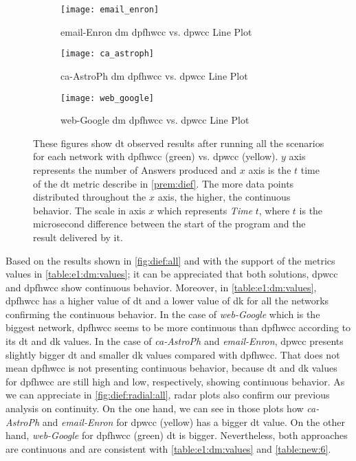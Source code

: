 \begin{figure}[h!]
  \centering
  \begin{subfigure}[t]{0.3\textwidth}
   \texttt{[image: email\_enron]}
   \caption{email-Enron \acrlong{dm} \acrshort{dpfhwcc} vs. \acrshort{dpwcc} Line Plot}
    \label{fig:dief:new:1}
  \end{subfigure}\hfill
  \begin{subfigure}[t]{0.3\textwidth}
   \texttt{[image: ca\_astroph]}
   \caption{ca-AstroPh \acrlong{dm} \acrshort{dpfhwcc} vs. \acrshort{dpwcc} Line Plot}
    \label{fig:dief:new:2}
  \end{subfigure}\hfill
  \begin{subfigure}[t]{0.3\textwidth}
   \texttt{[image: web\_google]}
   \caption{web-Google \acrlong{dm} \acrshort{dpfhwcc} vs. \acrshort{dpwcc} Line Plot}
    \label{fig:dief:new:3}
  \end{subfigure}\hfill
   \caption{These figures show \acrshort{dt} observed results after running all the scenarios for each network with \acrshort{dpfhwcc} (green) vs. \acrshort{dpwcc} (yellow). $y$ axis represents the number of Answers produced and $x$ axis is the $t$ time of the \acrshort{dt} metric describe in \autoref{prem:dief}. The more data points distributed throughout the $x$ axis, the higher, the continuous behavior. The scale in axis $x$ which represents \textit{Time} $t$, where $t$ is the microsecond difference between the start of the program and the result delivered by it.}
   \label{fig:dief:all}
 \end{figure}

Based on the results shown in \autoref{fig:dief:all} and with the support of the metrics values in \autoref{table:e1:dm:values}; it can be appreciated that both solutions, \acrshort{dpwcc} and \acrshort{dpfhwcc} show continuous behavior.
Moreover, in \autoref{table:e1:dm:values}, \acrshort{dpfhwcc} has a higher value of \acrshort{dt} and a lower value of \acrshort{dk} for all the networks confirming the continuous behavior. In the case of \textit{web-Google} which is the biggest network, \acrshort{dpfhwcc} seems to be more continuous than \acrshort{dpfhwcc} according to its \acrshort{dt} and \acrshort{dk} values. In the case of \emph{ca-AstroPh} and \emph{email-Enron}, \acrshort{dpwcc} presents slightly bigger \acrshort{dt} and smaller \acrshort{dk} values compared with \acrshort{dpfhwcc}. That does not mean \acrshort{dpfhwcc} is not presenting continuous behavior, because \acrshort{dt} and \acrshort{dk} values for \acrshort{dpfhwcc} are still high and low, respectively, showing continuous behavior.
As we can appreciate in \autoref{fig:dief:radial:all}, radar plots also confirm our previous analysis on continuity. On the one hand, we can see in those plots how \emph{ca-AstroPh} and \emph{email-Enron} for \acrshort{dpwcc} (yellow) has a bigger \acrshort{dt} value. On the other hand, \emph{web-Google} for \acrshort{dpfhwcc} (green) \acrshort{dt} is bigger. Nevertheless, both approaches are continuous and are consistent with \autoref{table:e1:dm:values} and \autoref{table:new:6}.

